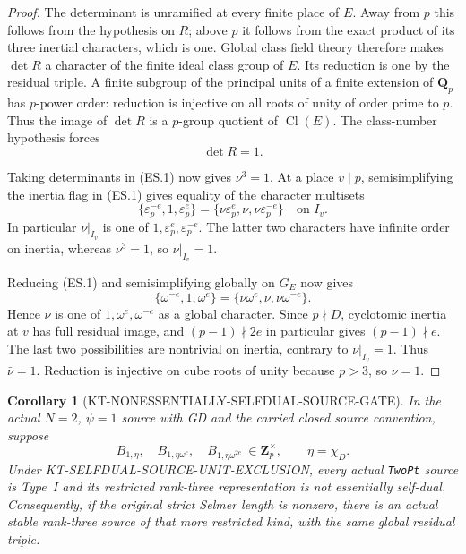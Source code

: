 \documentclass[11pt,a4paper]{article}
\newtheorem{corollary}[theorem]{Corollary}
\theoremstyle{definition}
\begin{document}
\begin{proof}
The determinant is unramified at every finite place of $E$.
Away from $p$ this follows from the hypothesis on $R$; above
$p$ it follows from the exact product of its three inertial
characters, which is one.  Global class field theory therefore
makes $\det R$ a character of the finite ideal class group of
$E$.  Its reduction is one by the residual triple.
A finite subgroup of the principal units of a finite extension
of $\mathbf Q_p$ has $p$-power order: reduction is injective
on all roots of unity of order prime to $p$.
Thus the image of $\det R$ is a $p$-group quotient of
$\operatorname{Cl}(E)$.  The class-number hypothesis forces
\[
                              \det R=1.                  \tag{ES.2}
\]

Taking determinants in (ES.1) now gives $\nu^3=1$.
At a place $v\mid p$, semisimplifying the inertia flag in
(ES.1) gives equality of the character multisets
\[
 \{\varepsilon_p^{-e},1,\varepsilon_p^e\}
   =\{\nu\varepsilon_p^e,\nu,\nu\varepsilon_p^{-e}\}
       \quad\text{on }I_v.                               \tag{ES.3}
\]
In particular $\nu|_{I_v}$ is one of
$1,\varepsilon_p^e,\varepsilon_p^{-e}$.
The latter two characters have infinite order on inertia,
whereas $\nu^3=1$, so $\nu|_{I_v}=1$.

Reducing (ES.1) and semisimplifying globally on $G_E$ now
gives
\[
     \{\omega^{-e},1,\omega^e\}
          =\{\bar\nu\omega^e,\bar\nu,
                                      \bar\nu\omega^{-e}\}.
                                                               \tag{ES.4}
\]
Hence $\bar\nu$ is one of $1,\omega^e,\omega^{-e}$ as a
global character.  Since $p\nmid D$, cyclotomic inertia at
$v$ has full residual image, and $(p-1)\nmid2e$ in
particular gives $(p-1)\nmid e$.  The last two possibilities
are nontrivial on inertia, contrary to $\nu|_{I_v}=1$.
Thus $\bar\nu=1$.  Reduction is injective on cube roots
of unity because $p>3$, so $\nu=1$.
\end{proof}

\begin{corollary}[KT-NONESSENTIALLY-SELFDUAL-SOURCE-GATE]
In the actual $N=2$, $\psi=1$ source with GD and the carried
closed source convention, suppose
\[
 B_{1,\eta},\quad B_{1,\eta\omega^e},\quad
 B_{1,\eta\omega^{2e}}\ \in\mathbf Z_p^\times,
 \qquad \eta=\chi_D.                                    \tag{ES.5}
\]
Under KT-SELFDUAL-SOURCE-UNIT-EXCLUSION, every actual
\texttt{TwoPt} source is Type~I and its restricted rank-three
representation is not essentially self-dual.
Consequently, if the original strict Selmer length is nonzero,
there is an actual stable rank-three source of that more
restricted kind, with the same global residual triple.
\end{corollary}
\end{document}

